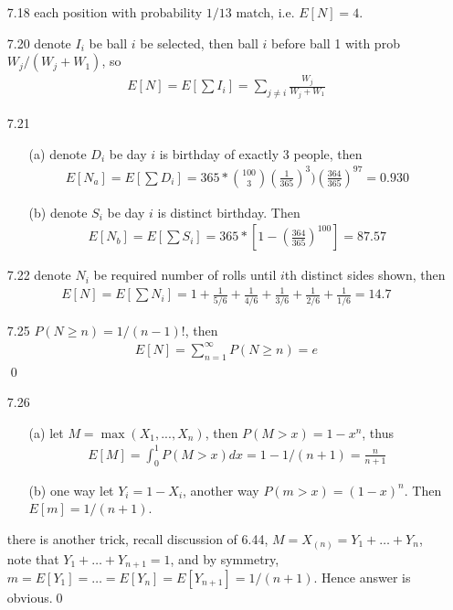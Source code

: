 \documentclass[paper=a4, fontsize=11pt]{scrartcl} %
\numberwithin{equation}{section} %
\numberwithin{figure}{section} %
\numberwithin{table}{section} %
\begin{document}
\begin{itemize}
\begin{itemize}
	\end{itemize}
	\item[7.18] each position with probability $1/13$ match, i.e. $E[N]=4$.
	\item[7.20] denote $I_i$ be ball $i$ be selected, then ball $i$ before ball 1 with prob $W_j/(W_j+W_1)$, so
	\begin{align}
		E[N] = E[\sum I_i] = \sum_{j\neq i} \frac{W_j}{W_j+W_1}
	\end{align}
	\item[7.21]
	\begin{itemize}
		\item[(a)] denote $D_i$ be day $i$ is birthday of exactly 3 people, then
		\begin{align}
			E[N_a] = E[\sum D_i] = 365 * {100\choose 3} (\frac{1}{365})^3)(\frac{364}{365})^{97} = 0.930
		\end{align}
		\item[(b)] denote $S_i$ be day $i$ is distinct birthday. Then
		\begin{align}
			E[N_b] = E[\sum S_i] = 365 * [1 - (\frac{364}{365})^{100}] = 87.57
		\end{align}
	\end{itemize}
	\item[7.22] denote $N_i$ be required number of rolls until $i$th distinct sides shown, then
	\begin{align}
		E[N] = E[\sum N_i] = 1 + \frac{1}{5/6} + \frac{1}{4/6} + \frac{1}{3/6} + \frac{1}{2/6} + \frac{1}{1/6} = 14.7
	\end{align}
	\item[7.25] $P(N\geq n) = 1/(n-1)!$, then
	\begin{align}
		E[N] = \sum_{n=1}^\infty P(N\geq n) = e
	\end{align}\qed
	\item[7.26]
	\begin{itemize}
		\item[(a)] let $M = \max(X_1,...,X_n)$, then $P(M> x)= 1 - x^n$, thus
		\begin{align}
			E[M] = \int_0^1 P(M>x)dx = 1 - 1/(n+1) = \frac{n}{n+1}
		\end{align}
		\item[(b)] one way let $Y_i=1-X_i$, another way $P(m>x)=(1-x)^n$. Then $E[m] = 1/(n+1)$.
	\end{itemize}
	there is another trick, recall discussion of 6.44, $M= X_{(n)} = Y_1 +\dots+Y_n$, note that $Y_1 + \dots+ Y_{n+1} =1$, and by symmetry, $m=E[Y_1]=\dots=E[Y_n]=E[Y_{n+1}] = 1/(n+1)$. Hence answer is obvious.\qed

\end{itemize}
\end{document}
